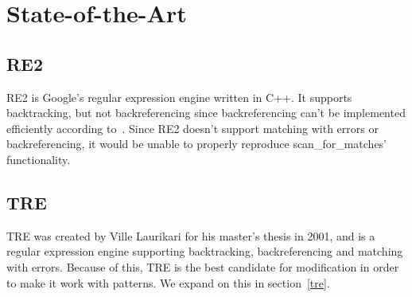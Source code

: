 \section{State-of-the-Art}
 \subsection{RE2} %
 RE2 is Google's regular expression engine written in C++. It supports 
 backtracking, but not backreferencing since backreferencing can't be implemented 
 efficiently according to~\cite{web6}. Since RE2 doesn't support matching with 
 errors or backreferencing, it would be unable to properly reproduce 
 scan\_for\_matches' functionality.
 
 \subsection{TRE} %
 TRE was created by Ville Laurikari for his master's thesis in 2001, and 
 is a regular expression engine supporting backtracking, backreferencing and 
 matching with errors. Because of this, TRE is the best candidate for modification 
 in order to make it work with patterns. We expand on this in section~\ref{tre}.
